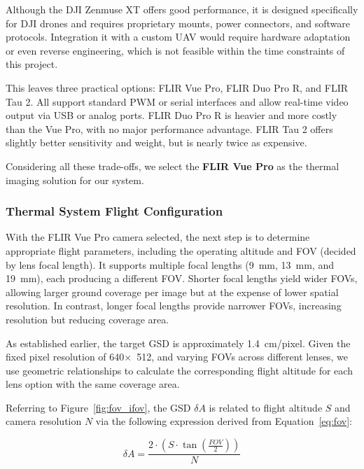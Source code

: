 Although the DJI Zenmuse XT offers good performance, it is designed specifically for DJI drones and requires proprietary mounts, power connectors, and software protocols. Integration it with a custom \gls{UAV} would require hardware adaptation or even reverse engineering, which is not feasible within the time constraints of this project.

This leaves three practical options: FLIR Vue Pro, FLIR Duo Pro R, and FLIR Tau 2. All support standard PWM or serial interfaces and allow real-time video output via USB or analog ports. FLIR Duo Pro R is heavier and more costly than the Vue Pro, with no major performance advantage. FLIR Tau 2 offers slightly better sensitivity and weight, but is nearly twice as expensive.

Considering all these trade-offs, we select the \textbf{FLIR Vue Pro} as the thermal imaging solution for our system.



\subsubsection{Thermal System Flight Configuration}\label{thermal_flight}

With the FLIR Vue Pro camera selected, the next step is to determine appropriate flight parameters, including the operating altitude and \gls{FOV} (decided by lens focal length). It supports multiple focal lengths (9~mm, 13~mm, and 19~mm), each producing a different \gls{FOV}. Shorter focal lengths yield wider \gls{FOV}s, allowing larger ground coverage per image but at the expense of lower spatial resolution. In contrast, longer focal lengths provide narrower \gls{FOV}s, increasing resolution but reducing coverage area.

As established earlier, the target \gls{GSD} is approximately 1.4~cm/pixel. Given the fixed pixel resolution of 640×~512, and varying \gls{FOV}s across different lenses, we use geometric relationships to calculate the corresponding flight altitude for each lens option with the same coverage area.

Referring to Figure~\ref{fig:fov_ifov}, the \gls{GSD} \( \delta A \) is related to flight altitude \( S \) and camera resolution \( N \) via the following expression derived from Equation~\ref{eq:fov}:

\begin{equation}
\delta A = \frac{2 \cdot (S \cdot \tan(\frac{FOV}{2}))}{N}
\end{equation}

